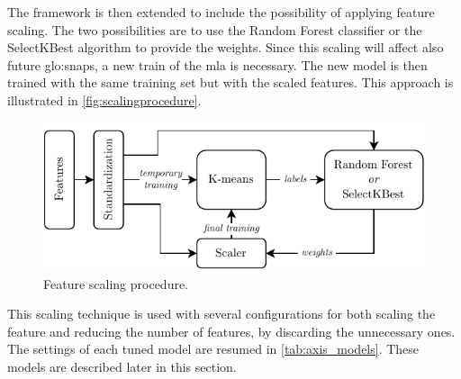 The framework is then extended to include the possibility of applying feature scaling. The two possibilities are to use the Random Forest classifier or the SelectKBest algorithm to provide the weights. Since this scaling will affect also future \gls{glo:snap}s, a new train of the \gls{mla} is necessary. The new model is then trained with the same training set but with the scaled features. This approach is illustrated in \autoref{fig:scalingprocedure}.

\begin{figure}[h!]
    \centering
    \includegraphics{images/LinearMotor/Feat_scaling.pdf}
    \caption{Feature scaling procedure.}
    \label{fig:scalingprocedure}
\end{figure}

This scaling technique is used with several configurations for both scaling the feature and reducing the number of features, by discarding the unnecessary ones. The settings of each tuned model are resumed in \autoref{tab:axis_models}. These models are described later in this section.

